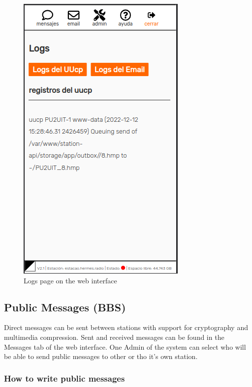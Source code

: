 \documentclass[11pt,a4paper]{article}
\begin{document}
    \begin{figure}[H]
    \centering
    \includegraphics[width=0.5\columnwidth]{screenshots/frontend/es/logs.png}
    \caption{Logs page on the web interface}
    \label{fig:logs}
\end{figure}



\subsection{Public Messages  (BBS)}

Direct messages can be sent between stations with support for cryptography and multimedia compression. Sent and received messages can be found in the Messages tab of the web interface. One Admin of the system can select who will be able to send public messages to other or tho it's own station.

\subsubsection{How to write public messages}
\end{document}
